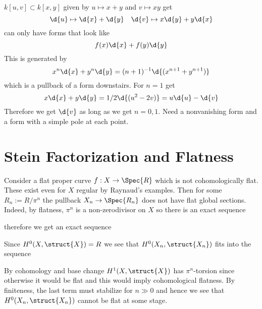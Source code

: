 \documentclass[12pt]{article}
\begin{document}
\section{}

$k[u,v] \subset k[x,y]$ given by $u \mapsto x + y$ and $v \mapsto xy$ get 
\[ \d{u} \mapsto \d{x} + \d{y} \quad \d{v} \mapsto x \d{y} + y \d{x} \]
can only have forms that look like 
\[ f(x) \d{x} + f(y) \d{y} \]
This is generated by
\[ x^n \d{x} + y^n \d{y} = (n+1)^{-1} \d{(x^{n+1} + y^{n+1})} \]
which is a pullback of a form downstairs. For $n=1$ get
\[ x \d{x} + y \d{y} = 1/2 \d{(u^2 - 2 v)}= u \d{u} - \d{v} \]
Therefore we get $\d{v}$ as long as we get $n = 0,1$. Need a nonvanishing form and a form with a simple pole at each point.

\section{Stein Factorization and Flatness}

\begin{example}
Consider a flat proper curve $f : X \to \Spec{R}$ which is not cohomologically flat. These exist even for $X$ regular by Raynaud's examples. Then for some $R_n := R / \pi^n$ the pullback $X_n \to \Spec{R_n}$ does not have flat global sections. Indeed, by flatness, $\pi^n$ is a non-zerodivisor on $X$ so there is an exact sequence
\begin{center}
\end{center} 
therefore we get an exact sequence
\begin{center}
\end{center}
Since $H^0(X, \struct{X}) = R$ we see that $H^0(X_n, \struct{X_n})$ fits into the sequence
\begin{center}
\end{center}
By cohomology and base change $H^1(X, \struct{X})$ has $\pi^n$-torsion since otherwise it would be flat and this would imply cohomological flatness. By finiteness, the last term must stabilize for $n \gg 0$ and hence we see that $H^0(X_n, \struct{X_n})$ cannot be flat at some stage.
\end{example}
\end{document}
